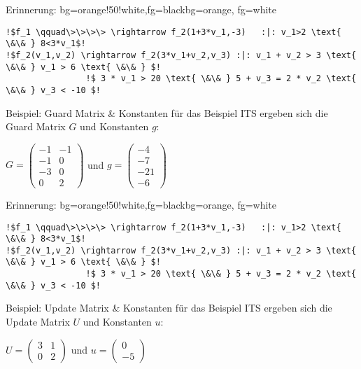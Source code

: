 \begin{frame}[fragile]
	\begin{variableblock}{Erinnerung: \its}{bg=orange!50!white,fg=black}{bg=orange, fg=white}
		\begin{lstlisting}[linewidth=10.5cm, escapechar = !]
!$f_1 \qquad\>\>\>\> \rightarrow f_2(1+3*v_1,-3)   :|: v_1>2 \text{ \&\& } 8<3*v_1$!
!$f_2(v_1,v_2) \rightarrow f_2(3*v_1+v_2,v_3) :|: v_1 + v_2 > 3 \text{ \&\& } v_1 > 6 \text{ \&\& } $!
				!$ 3 * v_1 > 20 \text{ \&\& } 5 + v_3 = 2 * v_2 \text{ \&\& } v_3 < -10 $!
		\end{lstlisting}
	\end{variableblock}
	\begin{exampleblock}{Beispiel: Guard Matrix \& Konstanten}
		f\"ur das Beispiel ITS ergeben sich die Guard Matrix $G$ und Konstanten $g$:\newline
		\begin{center}
			\vspace{-2em}
			$G = \begin{pmatrix} -1 & -1 \\ -1 & 0 \\ -3 & 0 \\ 0 & 2 \end{pmatrix}$ und $g= \begin{pmatrix} -4 \\ -7 \\ -21 \\ -6 \end{pmatrix}$
		\end{center}		
	\end{exampleblock}
\end{frame}

\begin{frame}[fragile]
	\begin{variableblock}{Erinnerung: \its}{bg=orange!50!white,fg=black}{bg=orange, fg=white}
		\begin{lstlisting}[linewidth=10.5cm, escapechar = !]
!$f_1 \qquad\>\>\>\> \rightarrow f_2(1+3*v_1,-3)   :|: v_1>2 \text{ \&\& } 8<3*v_1$!
!$f_2(v_1,v_2) \rightarrow f_2(3*v_1+v_2,v_3) :|: v_1 + v_2 > 3 \text{ \&\& } v_1 > 6 \text{ \&\& } $!
				!$ 3 * v_1 > 20 \text{ \&\& } 5 + v_3 = 2 * v_2 \text{ \&\& } v_3 < -10 $!
		\end{lstlisting}
	\end{variableblock}
		\begin{exampleblock}{Beispiel: Update Matrix \& Konstanten}
			f\"ur das Beispiel ITS ergeben sich die Update Matrix $U$ und Konstanten $u$:\newline
			\begin{center}
				\vspace{-2em}
				$U = \begin{pmatrix} 3 & 1 \\ 0 & 2 \end{pmatrix}$ und $u = \begin{pmatrix} 0 \\ -5 \end{pmatrix}$
			\end{center}		
		\end{exampleblock}
\end{frame}

